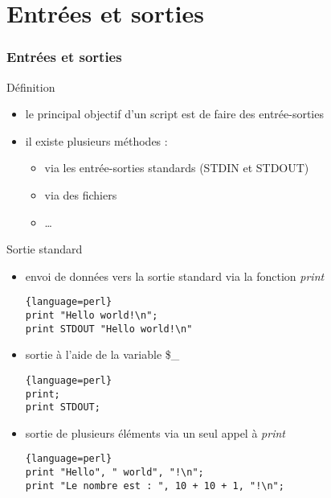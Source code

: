 \section{Entrées et sorties}

\begin{frame}[fragile]
  \frametitle{Entrées et sorties}

  \begin{block}{Définition}
    \begin{itemize}
    \item le principal objectif d'un script est de faire des entrée-sorties
    \item il existe plusieurs méthodes :
      \begin{itemize}
      \item via les entrée-sorties standards (STDIN et STDOUT)
      \item via des fichiers
      \item \ldots
      \end{itemize}
    \end{itemize}
  \end{block}

  \begin{exampleblock}{Sortie standard}
    \begin{itemize}
    \item envoi de données vers la sortie standard via la fonction
      \textit{print}
      \begin{lstlisting}{language=perl}
print "Hello world!\n";
print STDOUT "Hello world!\n"
      \end{lstlisting}
    \item sortie à l'aide de la variable \$\_
      \begin{lstlisting}{language=perl}
print;
print STDOUT;
      \end{lstlisting}
    \item sortie de plusieurs éléments via un seul appel à \textit{print}
      \begin{lstlisting}{language=perl}
print "Hello", " world", "!\n";
print "Le nombre est : ", 10 + 10 + 1, "!\n";
      \end{lstlisting}
    \end{itemize}
  \end{exampleblock}

\end{frame}


